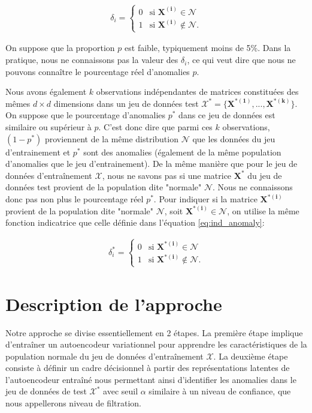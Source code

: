 \begin{gather}  \label{eq:ind_anomaly}
\delta_{i}=
\begin{cases}
0 & \text{si $\boldsymbol{X^{(i)}}\in\mathcal{N}$} \\
1 & \text{si $\boldsymbol{X^{(i)}}\not\in\mathcal{N}$}.
\end{cases}
\end{gather}

On suppose que la proportion $p$ est faible, typiquement moins de 5\%. Dans la pratique, nous ne connaissons pas la valeur des $\delta_i$, ce qui veut dire que nous ne pouvons connaître le pourcentage réel d'anomalies $p$. 

Nous avons également $k$ observations indépendantes de matrices constituées des mêmes $d \times d$ dimensions dans un jeu de données test $\mathcal{X^*} = \{\boldsymbol{X^{*(1)}},...,\boldsymbol{X^{*(k)}}\}$. On suppose que le pourcentage d'anomalies $p^*$ dans ce jeu de données est similaire ou supérieur à $p$. C'est donc dire que parmi ces $k$ observations, $(1-p^*)$ proviennent de la même distribution $\mathcal{N}$ que les données du jeu d'entrainement et $p^*$ sont des anomalies (également de la même population d'anomalies que le jeu d'entrainement). De la même manière que pour le jeu de données d'entraînement $\mathcal{X}$, nous ne savons pas si une matrice $\boldsymbol{X^{*}}$ du jeu de données test provient de la population dite "normale" $\mathcal{N}$. Nous ne connaissons donc pas non plus le pourcentage réel $p^*$. Pour indiquer si la matrice $\boldsymbol{X^{*(i)}}$ provient de la population dite "normale" $\mathcal{N}$, soit $ \boldsymbol{X^{*(i)}}\in\mathcal{N}$, on utilise la même fonction indicatrice que celle définie dans l'équation \ref{eq:ind_anomaly}:

\begin{gather}  \label{eq:ind_anomaly}
\delta^{*}_{i}=
\begin{cases}
0 & \text{si $\boldsymbol{X^{*(i)}}\in\mathcal{N}$} \\
1 & \text{si $\boldsymbol{X^{*(i)}}\not\in\mathcal{N}$}.
\end{cases}
\end{gather}


\section{Description de l'approche}

Notre approche se divise essentiellement en 2 étapes. La première étape implique d'entraîner un autoencodeur variationnel pour apprendre les caractéristiques de la population normale du jeu de données d'entraînement $\mathcal{X}$. La deuxième étape consiste à définir un cadre décisionnel à partir des représentations latentes de l'autoencodeur entraîné nous permettant ainsi d'identifier les anomalies dans le jeu de données de test $\mathcal{X^*}$ avec seuil $\alpha$ similaire à un niveau de confiance, que nous appellerons niveau de filtration.

